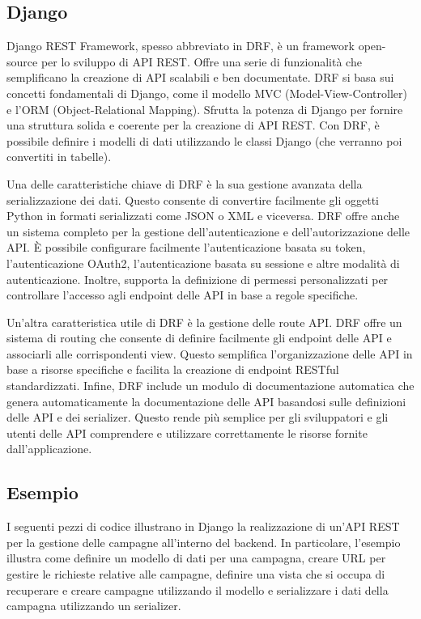 \subsection{Django}
\label{subsec:Django}
Django REST Framework, spesso abbreviato in DRF, è un framework 
open-source per lo sviluppo di API REST. Offre una serie di funzionalità 
che semplificano la creazione di API scalabili e ben documentate.
DRF si basa sui concetti fondamentali di Django, come il modello 
MVC (Model-View-Controller) e l'ORM (Object-Relational Mapping). 
Sfrutta la potenza di Django per fornire una struttura solida e coerente 
per la creazione di API REST. Con DRF, è possibile definire i modelli di 
dati utilizzando le classi Django (che verranno poi convertiti in tabelle).

Una delle caratteristiche chiave di DRF è la sua gestione avanzata della 
serializzazione dei dati. Questo consente di convertire facilmente gli 
oggetti Python in formati serializzati come JSON o XML e viceversa. 
DRF offre anche un sistema completo per la gestione dell'autenticazione 
e dell'autorizzazione delle API. È possibile configurare facilmente 
l'autenticazione basata su token, l'autenticazione OAuth2, l'autenticazione 
basata su sessione e altre modalità di autenticazione. Inoltre, supporta la 
definizione di permessi personalizzati per controllare l'accesso agli 
endpoint delle API in base a regole specifiche.

Un'altra caratteristica utile di DRF è la gestione delle route API. 
DRF offre un sistema di routing che consente di definire 
facilmente gli endpoint delle API e associarli alle corrispondenti view. 
Questo semplifica l'organizzazione delle API in base a risorse specifiche 
e facilita la creazione di endpoint RESTful standardizzati.
Infine, DRF include un modulo di documentazione automatica che genera 
automaticamente la documentazione delle API basandosi sulle definizioni 
delle API e dei serializer. Questo rende più semplice per gli sviluppatori 
e gli utenti delle API comprendere e utilizzare correttamente le risorse 
fornite dall'applicazione. ~\cite{wiki:django}\\


\subsection{Esempio}
I seguenti pezzi di codice illustrano in Django la realizzazione di 
un'API REST per la gestione delle campagne all'interno del backend.
In particolare, l'esempio illustra come definire un modello di dati per una 
campagna, creare URL per gestire le richieste relative alle campagne, definire 
una vista che si occupa di recuperare e creare campagne utilizzando il modello 
e serializzare i dati della campagna utilizzando un serializer.

